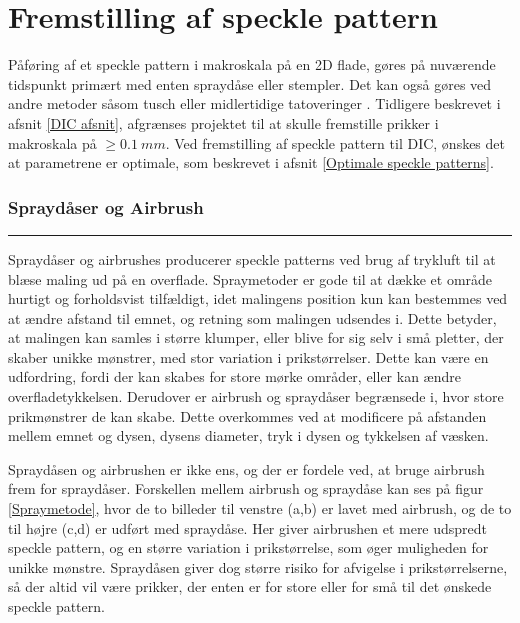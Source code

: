 \section{Fremstilling af speckle pattern} \label{Fremstilling af Speckle pattern}
Påføring af et speckle pattern i makroskala på en 2D flade, gøres på nuværende tidspunkt primært med enten spraydåse eller stempler. Det kan også gøres ved andre metoder såsom tusch eller midlertidige tatoveringer \parencite{Dong2017ACorrelation, Quino2021SpeckleEndurance}. Tidligere beskrevet i afsnit \ref{DIC afsnit}, afgrænses projektet til at skulle fremstille prikker i makroskala på $\geq \SI{0,1}{mm}$. Ved fremstilling af speckle pattern til DIC, ønskes det at parametrene er optimale, som beskrevet i afsnit \ref{Optimale speckle patterns}. 


\subsubsection{Spraydåser og Airbrush} \plainbreak{-.4}
Spraydåser og airbrushes producerer speckle patterns ved brug af trykluft til at blæse maling ud på en overflade. Spraymetoder er gode til at dække et område hurtigt og forholdsvist tilfældigt, idet malingens position kun kan bestemmes ved at ændre afstand til emnet, og retning som malingen udsendes i. Dette betyder, at malingen kan samles i større klumper, eller blive for sig selv i små pletter, der skaber unikke mønstrer, med stor variation i prikstørrelser. Dette kan være en udfordring, fordi der kan skabes for store mørke områder, eller kan ændre overfladetykkelsen. Derudover er airbrush og spraydåser begrænsede i, hvor store prikmønstrer de kan skabe. Dette overkommes ved at modificere på afstanden mellem emnet og dysen, dysens diameter, tryk i dysen og tykkelsen af væsken.\parencite{Dong2017ACorrelation, Quino2021SpeckleEndurance} 

Spraydåsen og airbrushen er ikke ens, og der er fordele ved, at bruge airbrush frem for spraydåser. Forskellen mellem airbrush og spraydåse kan ses på figur \ref{Spraymetode}, hvor de to billeder til venstre (a,b) er lavet med airbrush, og de to til højre (c,d) er udført med spraydåse. Her giver airbrushen et mere udspredt speckle pattern, og en større variation i prikstørrelse, som øger muligheden for unikke mønstre. Spraydåsen giver dog større risiko for afvigelse i prikstørrelserne, så der altid vil være prikker, der enten er for store eller for små til det ønskede speckle pattern. \parencite{Crammond2013SpeckleCorrelation}

